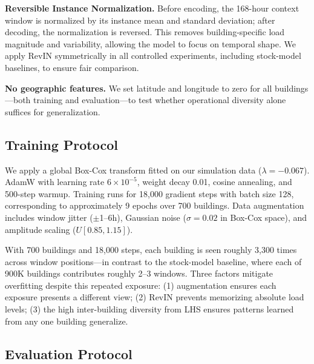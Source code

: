 \documentclass[preprint,12pt,authoryear]{elsarticle}
\begin{document}
\textbf{Reversible Instance Normalization.} Before encoding, the 168-hour context window is normalized by its instance mean and standard deviation; after decoding, the normalization is reversed. This removes building-specific load magnitude and variability, allowing the model to focus on temporal shape. We apply RevIN symmetrically in all controlled experiments, including stock-model baselines, to ensure fair comparison.

\textbf{No geographic features.} We set latitude and longitude to zero for all buildings---both training and evaluation---to test whether operational diversity alone suffices for generalization.

\subsection{Training Protocol}

We apply a global Box-Cox transform \citep{Box1964} fitted on our simulation data ($\lambda = -0.067$). AdamW \citep{Loshchilov2019} with learning rate $6 \times 10^{-5}$, weight decay 0.01, cosine annealing, and 500-step warmup. Training runs for 18,000 gradient steps with batch size 128, corresponding to approximately 9 epochs over 700 buildings. Data augmentation includes window jitter ($\pm$1--6h), Gaussian noise ($\sigma = 0.02$ in Box-Cox space), and amplitude scaling ($U[0.85, 1.15]$).

With 700 buildings and 18,000 steps, each building is seen roughly 3,300 times across window positions---in contrast to the stock-model baseline, where each of 900K buildings contributes roughly 2--3 windows. Three factors mitigate overfitting despite this repeated exposure: (1) augmentation ensures each exposure presents a different view; (2) RevIN prevents memorizing absolute load levels; (3) the high inter-building diversity from LHS ensures patterns learned from any one building generalize.

\subsection{Evaluation Protocol}
\label{sec:eval}
\end{document}
